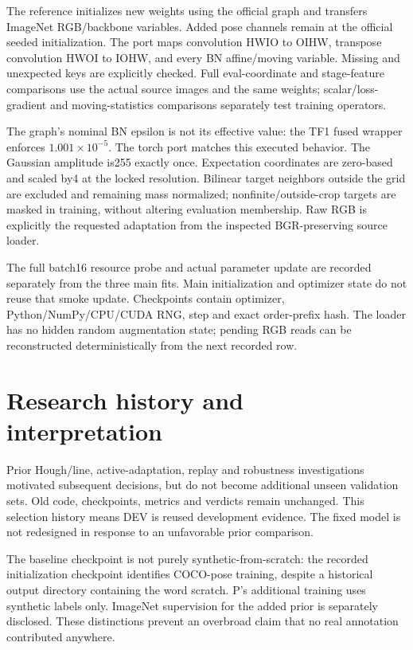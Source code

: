 \documentclass[10pt]{article}
\begin{document}
The reference initializes new weights using the official graph and transfers ImageNet RGB/backbone variables. Added pose channels remain at the official seeded initialization. The port maps convolution HWIO to OIHW, transpose convolution HWOI to IOHW, and every BN affine/moving variable. Missing and unexpected keys are explicitly checked. Full eval-coordinate and stage-feature comparisons use the actual source images and the same weights; scalar/loss-gradient and moving-statistics comparisons separately test training operators.

The graph's nominal BN epsilon is not its effective value: the TF1 fused wrapper enforces $1.001\times10^{-5}$. The torch port matches this executed behavior. The Gaussian amplitude is255 exactly once. Expectation coordinates are zero-based and scaled by4 at the locked resolution. Bilinear target neighbors outside the grid are excluded and remaining mass normalized; nonfinite/outside-crop targets are masked in training, without altering evaluation membership. Raw RGB is explicitly the requested adaptation from the inspected BGR-preserving source loader.

The full batch16 resource probe and actual parameter update are recorded separately from the three main fits. Main initialization and optimizer state do not reuse that smoke update. Checkpoints contain optimizer, Python/NumPy/CPU/CUDA RNG, step and exact order-prefix hash. The loader has no hidden random augmentation state; pending RGB reads can be reconstructed deterministically from the next recorded row.
\section{Research history and interpretation}
Prior Hough/line, active-adaptation, replay and robustness investigations motivated subsequent decisions, but do not become additional unseen validation sets. Old code, checkpoints, metrics and verdicts remain unchanged. This selection history means DEV is reused development evidence. The fixed model is not redesigned in response to an unfavorable prior comparison.

The baseline checkpoint is not purely synthetic-from-scratch: the recorded initialization checkpoint identifies COCO-pose training, despite a historical output directory containing the word scratch. P's additional training uses synthetic labels only. ImageNet supervision for the added prior is separately disclosed. These distinctions prevent an overbroad claim that no real annotation contributed anywhere.
\end{document}

